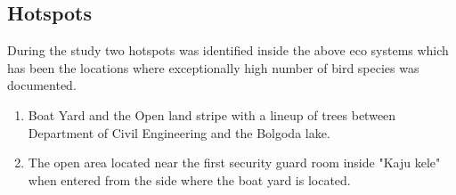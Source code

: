 \subsection{Hotspots}
During the study two hotspots was identified inside the above eco systems which has been the locations where exceptionally high number of bird species was documented.
\begin{enumerate}
    \item  Boat Yard and the Open land stripe with a lineup of trees between Department of Civil Engineering and the Bolgoda lake.
    \item The open area located near the first security guard room inside "Kaju kele" when entered from the side where the boat yard is located.
\end{enumerate}